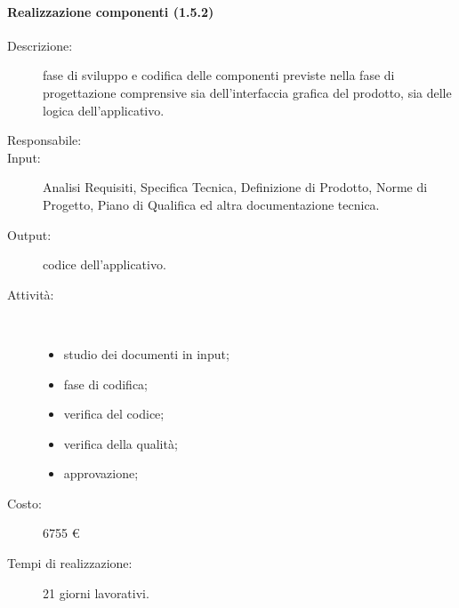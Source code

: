 \paragraph{Realizzazione componenti (1.5.2)}
\begin{description}
\item[Descrizione:] fase di sviluppo e codifica delle componenti previste nella fase di progettazione comprensive sia dell'interfaccia grafica del prodotto, sia delle logica dell'applicativo.
\item[Responsabile:] 
\item[Input:] Analisi Requisiti, Specifica Tecnica, Definizione di Prodotto, Norme di Progetto, Piano di Qualifica ed altra documentazione tecnica.
\item[Output:] codice dell'applicativo.
\item[Attività:]\mbox{}\\[-1.5\baselineskip]
	\begin{itemize}
	\item studio dei documenti in input;
	\item fase di codifica;
	\item verifica del codice;
	\item verifica della qualit\`{a};
	\item approvazione;
	\end{itemize}
\item[Costo:] 6755 \euro{}
\item[Tempi di realizzazione:] 21 giorni lavorativi.
\end{description}

